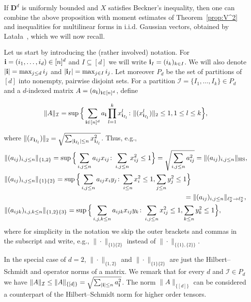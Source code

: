 \documentclass[a4paper]{amsart}
\theoremstyle{definition}
\theoremstyle{remark}
\numberwithin{equation}{section}
\def\ii{{\bf i}}
\newcommand*{\HS}{\text{HS}}
\begin{document}
If $\mathbf{D}^d$ is uniformly bounded and $X$ satisfies Beckner's inequality, then one can combine the above proposition with moment estimates of Theorem~\ref{prop:V^2} and inequalities for multilinear forms in i.i.d. Gaussian vectors, obtained by Lata{\l}a~\cite{MR2294983}, which we will now recall.

Let us start by introducing the (rather involved) notation. For $\ii = (i_1,\ldots,i_d) \in [n]^d$ and $I\subseteq[d]$ we will write $\ii_{I}=(i_{k})_{k\in I}$. We will also denote $|\ii| = \max_{j\le d} {i_j}$ and $|\ii_I| = \max_{j \in I} i_j$.  Let moreover $P_d$ be the set of partitions of $[d]$ into nonempty, pairwise disjoint sets. For a partition $\mathcal{I} =\{I_1,\ldots,I_k\} \in P_d$ and a $d$-indexed matrix $A = (a_\ii)_{\ii \in [n]^d}$, define


\begin{align}\label{eq:Gaussian_norm_def}
\|A\|_{\mathcal{I}}=\sup\Big\{\sum_{\ii\in [n]^d} a_{\ii}\prod_{l=1}^k x^{l}_{\ii_{I_l}}\colon
\|(x^{l}_{\ii_{I_l}})\|_2\leq 1, 1\leq l\leq k \Big\},
\end{align}

where $\|(x_{\ii_{I_l}})\|_2 = \sqrt{\sum_{|\ii_{I_l}|\le n} x_{\ii_{I_l}}^2}$. Thus, e.g.,
\begin{align*}
&\|(a_{ij})_{i,j\le n}\|_{\{1,2\}}= \sup\Big\{ \sum_{i,j\le n} a_{ij}x_{ij}\colon \sum_{i,j\le n} x_{ij}^2 \le 1\Big\} = \sqrt{\sum_{i,j\le n}a_{ij}^2} = \|(a_{ij})_{i,j\le n}\|_{\HS},\\
& \|(a_{ij})_{i,j\le n}\|_{\{1\}\{2\}}= \sup\Big\{ \sum_{i,j\le n} a_{ij}x_iy_j\colon \sum_{i\le n} x_{i}^2\le 1,\sum_{j\le n}y_j^2 \le 1\Big\} \\
\MoveEqLeft[-26.5]= \|(a_{ij})_{i,j\le n}\|_{\ell_2^n\to \ell_2^n},\\
& \|(a_{ijk})_{i,j,k\le n}\|_{\{1,2\} \{3\}} = \sup\Big\{ \sum_{i,j,k\le n} a_{ijk}x_{ij}y_k\colon \sum_{i,j\le n} x_{ij}^2\le 1,\sum_{k\le n}y_k^2 \le 1\Big\},
\end{align*}
where for simplicity in the notation we skip the outer brackets and commas in the subscript and write, e.g., $\|\cdot\|_{\{1\}\{2\}}$ instead of $\|\cdot\|_{\{\{1\},\{2\}\}}$.

In the special case of $d=2$, $\|\cdot\|_{\{1,2\}}$ and $\|\cdot\|_{\{1\}\{2\}}$ are just the Hilbert--Schmidt and operator norms of a matrix. We remark that for every $d$ and $\mathcal{I} \in P_d$ we have $\|A\|_{\mathcal{I}} \le \|A\|_{\{[d]\}} = \sqrt{\sum_{|\ii|\le n} a_\ii^2}$. The norm $\|A\|_{\{[d]\}}$ can be considered a counterpart of the Hilbert--Schmidt norm for higher order tensors.
\end{document}
